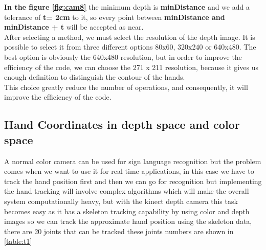 \textbf{In the figure \ref{fig:cam8}} the minimum depth is \textbf{minDistance} and we add a tolerance of\textbf{  t= 2cm }to it, so every point between \textbf{minDistance and minDistance + t }  will be accepted as near.\\After selecting a method, we must select the resolution of the depth image. It is possible to select it from three different  options 80x60, 320x240 or 640x480. The best option is obviously the 640x480 resolution, but in order to improve the efﬁciency of the code, we can choose the 271 x 211 resolution, because it gives us enough deﬁnition to distinguish the contour  of the hands. \\This choice greatly reduce the number of operations, and consequently, it will improve the efﬁciency of the code.

\subsection{Hand Coordinates in depth space and color space }
A normal color camera can be used for sign language recognition but the problem comes when we want to use it for real time applications, in this case we have to track the hand position first and then we can go for recognition but implementing the hand tracking will involve complex algorithms which will make the overall system  computationally heavy, but with the kinect depth camera this task becomes easy as it has a skeleton tracking capability by using color and depth images so we can track the approximate hand position using the skeleton data, there are 20 joints that can be tracked these joints numbers are shown in \ref{table:t1}\\

